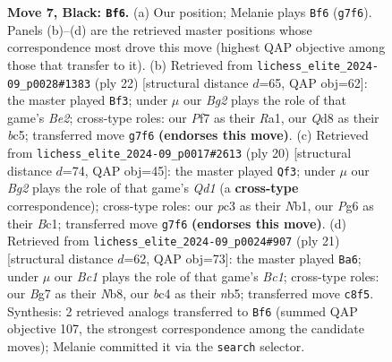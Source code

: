 \documentclass[11pt]{article}
\begin{document}
\begin{figure}[p]
\caption{\textbf{Move 7, Black: \texttt{Bf6}.} (a) Our position; Melanie plays \texttt{Bf6} (\texttt{g7f6}). Panels (b)--(d) are the retrieved master positions whose correspondence most drove this move (highest QAP objective among those that transfer to it). (b) Retrieved from \texttt{lichess\_elite\_2024-09\_p0028\#1383} (ply 22) [structural distance $d$=65, QAP obj=62]: the master played \texttt{Bf3}; under $\mu$ our \emph{Bg2} plays the role of that game's \emph{Be2}; cross-type roles: our \emph{P}f7 as their \emph{R}a1, our \emph{Q}d8 as their \emph{b}c5; transferred move \texttt{g7f6} \textbf{(endorses this move)}. (c) Retrieved from \texttt{lichess\_elite\_2024-09\_p0017\#2613} (ply 20) [structural distance $d$=74, QAP obj=45]: the master played \texttt{Qf3}; under $\mu$ our \emph{Bg2} plays the role of that game's \emph{Qd1} (a \textbf{cross-type} correspondence); cross-type roles: our \emph{p}c3 as their \emph{N}b1, our \emph{P}g6 as their \emph{B}c1; transferred move \texttt{g7f6} \textbf{(endorses this move)}. (d) Retrieved from \texttt{lichess\_elite\_2024-09\_p0024\#907} (ply 21) [structural distance $d$=62, QAP obj=73]: the master played \texttt{Ba6}; under $\mu$ our \emph{Bc1} plays the role of that game's \emph{Bc1}; cross-type roles: our \emph{B}g7 as their \emph{N}b8, our \emph{b}c4 as their \emph{n}b5; transferred move \texttt{c8f5}. Synthesis: 2 retrieved analogs transferred to \texttt{Bf6} (summed QAP objective 107, the strongest correspondence among the candidate moves); Melanie committed it via the \texttt{search} selector.}
\label{fig:thought-m13}
\end{figure}

\clearpage
\end{document}
